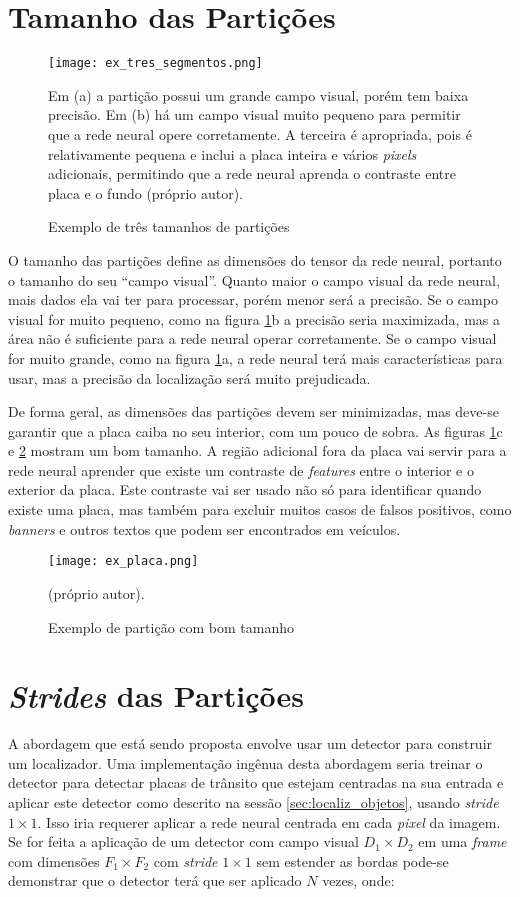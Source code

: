 \section{Tamanho das Partições}
\begin{figure}[!htb]
	\centering
	\texttt{[image: ex\_tres\_segmentos.png]}
	\caption{Exemplo de três tamanhos de partições}
	\label{fig:ex_tres_segmentos}
	Em (a) a partição possui um grande campo visual, porém tem baixa precisão.
	Em (b) há um campo visual muito pequeno para permitir que a rede neural
	opere corretamente. A terceira é apropriada, pois é relativamente pequena e
	inclui a placa inteira e vários \emph{pixels} adicionais, permitindo que a
	rede neural aprenda o contraste entre placa e o fundo (próprio autor).
\end{figure}

O tamanho das partições define as dimensões do tensor da rede neural, portanto
o tamanho do seu ``campo visual''.
Quanto maior o campo visual da rede neural, mais dados ela vai ter para
processar, porém menor será a precisão. Se o campo visual for muito pequeno,
como na figura \ref{fig:ex_tres_segmentos}b a precisão seria maximizada,
mas a área não é suficiente para a rede neural operar corretamente. Se
o campo visual for muito grande, como na figura \ref{fig:ex_tres_segmentos}a,
a rede neural terá mais características para usar, mas a precisão da
localização será muito prejudicada.

De forma geral, as dimensões das partições devem ser minimizadas, mas deve-se
garantir que a placa caiba no seu interior, com um pouco de
sobra. As figuras \ref{fig:ex_tres_segmentos}c e \ref{fig:ex_placa} mostram
um bom tamanho. A região adicional fora da placa vai servir para a rede
neural aprender que existe um contraste de \emph{features} entre o
interior e o exterior da placa. Este contraste vai ser usado não só para
identificar quando existe uma placa, mas também para excluir muitos casos de
falsos positivos, como \emph{banners} e outros textos que podem ser
encontrados em veículos.

\begin{figure}[!htb]
	\centering
	\texttt{[image: ex\_placa.png]}
	\caption{Exemplo de partição com bom tamanho}
	\label{fig:ex_placa}
	(próprio autor).
\end{figure}

\section{\emph{Strides} das Partições}
A abordagem que está sendo proposta envolve usar um detector para construir um
localizador. Uma implementação ingênua desta abordagem seria treinar o detector
para detectar placas de trânsito que estejam centradas na sua entrada e aplicar
este detector como descrito na sessão \ref{sec:localiz_objetos}, usando
\emph{stride} $1 \times 1$.  Isso iria requerer aplicar a rede neural centrada
em cada \emph{pixel} da imagem. Se for feita a aplicação de um detector com
campo visual $D_1 \times D_2$ em uma \emph{frame} com dimensões $F_1 \times
F_2$ com \emph{stride} $1 \times 1$ sem estender as bordas pode-se demonstrar
que o detector terá que ser aplicado $N$ vezes, onde:

